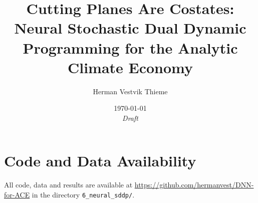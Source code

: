 \documentclass[11pt]{article}
\title{Cutting Planes Are Costates: Neural Stochastic Dual Dynamic\\ Programming for the Analytic Climate Economy}
\author{Herman Vestvik Thieme}
\date{\today \\[0.5em] \textit{Draft}}
\theoremstyle{remark}
\begin{document}
\maketitle

\begin{abstract}

\end{abstract}










\appendix


\section*{Code and Data Availability}
All code, data and results are available at \url{https://github.com/hermanvest/DNN-for-ACE} in the directory \texttt{6\_neural\_sddp/}.

\printbibliography
\end{document}
